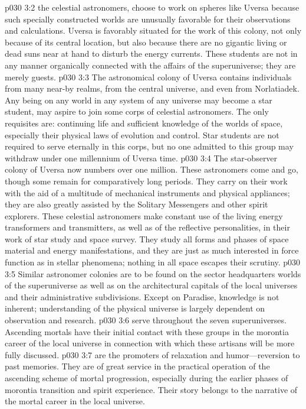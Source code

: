 \pc \vs p030 3:2 \bibnobreakspace {} the celestial astronomers, choose to work on spheres like Uversa because such specially constructed worlds are unusually favorable for their observations and calculations. Uversa is favorably situated for the work of this colony, not only because of its central location, but also because there are no gigantic living or dead suns near at hand to disturb the energy currents. These students are not in any manner organically connected with the affairs of the superuniverse; they are merely guests.
\vs p030 3:3 The astronomical colony of Uversa contains individuals from many near\hyp{}by realms, from the central universe, and even from Norlatiadek. Any being on any world in any system of any universe may become a star student, may aspire to join some corps of celestial astronomers. The only requisites are: continuing life and sufficient knowledge of the worlds of space, especially their physical laws of evolution and control. Star students are not required to serve eternally in this corps, but no one admitted to this group may withdraw under one millennium of Uversa time.
\vs p030 3:4 The star\hyp{}observer colony of Uversa now numbers over one million. These astronomers come and go, though some remain for comparatively long periods. They carry on their work with the aid of a multitude of mechanical instruments and physical appliances; they are also greatly assisted by the Solitary Messengers and other spirit explorers. These celestial astronomers make constant use of the living energy transformers and transmitters, as well as of the reflective personalities, in their work of star study and space survey. They study all forms and phases of space material and energy manifestations, and they are just as much interested in force function as in stellar phenomena; nothing in all space escapes their scrutiny.
\vs p030 3:5 Similar astronomer colonies are to be found on the sector headquarters worlds of the superuniverse as well as on the architectural capitals of the local universes and their administrative subdivisions. Except on Paradise, knowledge is not inherent; understanding of the physical universe is largely dependent on observation and research.
\pc \vs p030 3:6 \bibnobreakspace {} serve throughout the seven superuniverses. Ascending mortals have their initial contact with these groups in the morontia career of the local universe in connection with which these artisans will be more fully discussed.
\pc \vs p030 3:7 \bibnobreakspace {} are the promoters of relaxation and humor---reversion to past memories. They are of great service in the practical operation of the ascending scheme of mortal progression, especially during the earlier phases of morontia transition and spirit experience. Their story belongs to the narrative of the mortal career in the local universe.
